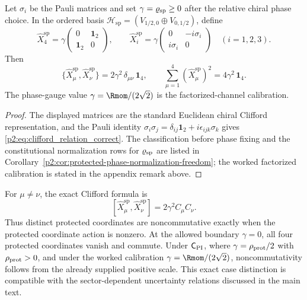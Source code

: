 \documentclass[11pt,a4paper]{article}
\begin{document}
\begin{proposition}
\label{p2:prop:X_spinor_block}
Let $\sigma_i$ be the Pauli matrices and set
\(\gamma=\varrho_{\rm sp}\ge0\) after the relative chiral phase choice.  In the ordered basis
$\mathcal{H}_{\mathrm{sp}}=(V_{1/2,0}\oplus V_{0,1/2})$,
define
\begin{equation}
\label{p2:eq:X_spinor_explicit}
\hat X_4^{\mathrm{sp}}=\gamma
\begin{pmatrix}
0 & \mathbf{1}_2\\
\mathbf{1}_2 & 0
\end{pmatrix},
\qquad
\hat X_i^{\mathrm{sp}}=\gamma
\begin{pmatrix}
0 & -i\sigma_i\\
i\sigma_i & 0
\end{pmatrix}\quad (i=1,2,3).
\end{equation}
Then
\begin{equation}
\label{p2:eq:clifford_relation_correct}
\{\hat X_\mu^{\mathrm{sp}},\hat X_\nu^{\mathrm{sp}}\}
=2\gamma^2\,\delta_{\mu\nu}\,\mathbf{1}_4,
\qquad
\sum_{\mu=1}^4 (\hat X_\mu^{\mathrm{sp}})^2
=4\gamma^2\,\mathbf{1}_4.
\end{equation}
The phase-gauge value
\(\gamma=\Rmom/(2\sqrt2)\) is the factorized-channel calibration.
\end{proposition}

\begin{proof}
The displayed matrices are the standard Euclidean chiral Clifford
representation, and the Pauli identity
\(\sigma_i\sigma_j=\delta_{ij}\mathbf{1}_2+i\epsilon_{ijk}\sigma_k\)
gives \eqref{p2:eq:clifford_relation_correct}.  The classification before
phase fixing and the constitutional normalization rows for \(\varrho_{\rm sp}\)
are listed in Corollary~\ref{p2:cor:protected-phase-normalization-freedom};
the worked factorized calibration is stated in the appendix remark above.
\end{proof}

\begin{remark}
For \(\mu\ne\nu\), the exact Clifford formula is
\[
 [\hat X_\mu^{\mathrm{sp}},\hat X_\nu^{\mathrm{sp}}]
 =2\gamma^2 C_\mu C_\nu.
\]
Thus distinct protected coordinates are noncommutative exactly when the
protected coordinate action is nonzero.  At the allowed boundary
\(\gamma=0\), all four protected coordinates vanish and commute.  Under
\(\mathsf C_{\rm PI}\), where \(\gamma=\rho_{\rm prot}/2\) with
\(\rho_{\rm prot}>0\), and under the worked calibration
\(\gamma=\Rmom/(2\sqrt2)\), noncommutativity follows from the already supplied
positive scale.  This exact case distinction is compatible with the
sector-dependent uncertainty relations discussed in the main text.
\end{remark}
\end{document}
